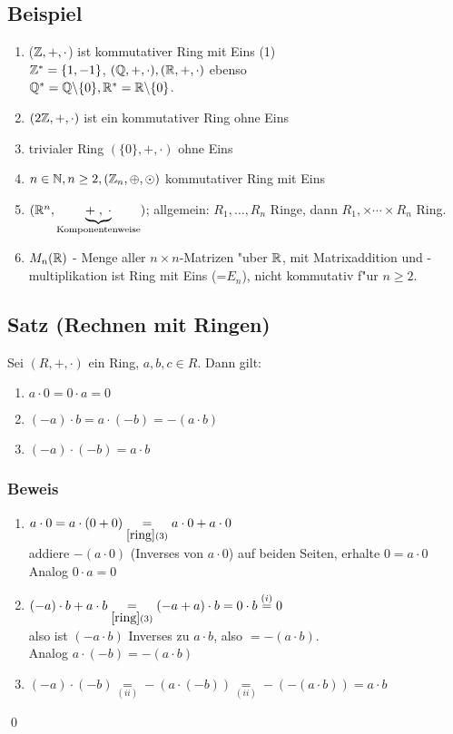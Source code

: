 \subsection{Beispiel}
\begin{enumerate}
	\item
	($\mathbb{Z}, +, \cdot$) ist kommutativer Ring mit Eins (1)\\
	$\mathbb{Z}^* = \{1,-1\}$,
	$(\mathbb{Q}, +, \cdot), (\mathbb{R}, +, \cdot)$ ebenso\\
	$\mathbb{Q}^*=\mathbb{Q} \backslash \{0\}, \mathbb{R}^* = \mathbb{R} \backslash \{0\}$.
	\item
	$(2\mathbb{Z}, +, \cdot)$ ist ein kommutativer Ring ohne Eins
	\item
	trivialer Ring $(\{0\},+, \cdot)$ ohne Eins
	\item
	$n \in \mathbb{N}, n \geq 2,  (\mathbb{Z}_n, \oplus, \odot)$ kommutativer Ring mit Eins
	\item
	$(\mathbb{R}^n, \underbrace{+\; ,\; \cdot}_{\text{Komponentenweise}})$; allgemein: $R_1, \dots , R_n$ Ringe, dann $R_1, \times \cdots \times R_n$ Ring.
	\item
	$M_n (\mathbb{R})$ - Menge aller $n \times n$-Matrizen  "uber $\mathbb{R}$, mit Matrixaddition und -multiplikation ist Ring mit Eins (=$E_n$), nicht kommutativ f"ur $ n \geq 2$.
\end{enumerate}

\subsection[Satz: Rechnen mit Ringen]{Satz (Rechnen mit Ringen)} \label{rechnenmitringen}
Sei $(R, +, \cdot)$ ein Ring, $a,b,c \in R$. Dann gilt:
{\renewcommand{\labelenumi}{(\roman{enumi})}\begin{enumerate}
	\item
	$a \cdot 0 = 0 \cdot a = 0$
	\item 
	$(-a)\cdot b = a \cdot (-b) = -(a \cdot b)$
	\item
	$(-a) \cdot (-b) = a \cdot b$
\end{enumerate}

\subsubsection*{Beweis}

\begin{enumerate}
	\item
	$a \cdot 0 = a \cdot (0+0) \underset{\ref{ring}(3)}{=}a \cdot 0 + a \cdot 0$\\
	addiere $-(a \cdot 0)$ (Inverses von $a \cdot 0$) auf beiden Seiten,  erhalte $0=a \cdot 0$\\
	Analog $0 \cdot a = 0$
	\item
	$(-a)\cdot b + a \cdot b \underset{\ref{ring}(3)}{=} (-a+a) \cdot b = 0 \cdot b \overset{(i)}{=}0$\\
	also ist $(-a \cdot b)$ Inverses zu $a \cdot b$, also $=-(a \cdot b)$.\\
	Analog $a \cdot (-b) = -(a \cdot b)$
	\item
	$(-a) \cdot (-b) \underset{(ii)}{=} -(a \cdot (-b)) \underset{(ii)}{=}-(-(a \cdot b)) = a \cdot b   $
\end{enumerate} } \qed

